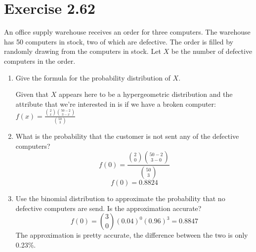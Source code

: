 \documentclass{article}
\begin{document}
\section*{Exercise 2.62}
An office supply warehouse receives an order for three computers. The warehouse has 50 computers in stock, two of which are defective. The order is filled by randomly drawing from the computers in stock. Let $X$ be the number of defective computers in the order.
\begin{enumerate}[\quad(a)]
	\item Give the formula for the probability distribution of $X$.
	\begin{center}
		Given that $X$ appears here to be a hypergeometric distribution and the attribute that we're interested in is if we have a broken computer:\\
		$ f(x) = \frac{\binom{2}{x} \binom{50-2}{3-x}}{\binom{50}{3}} $
	\end{center}
	\item What is the probability that the customer is not sent any of the defective computers?
		\[ f(0) = \frac{\binom{2}{0} \binom{50-2}{3-0}}{\binom{50}{3}} \]
		\[ f(0) = 0.8824 \]
	\item Use the binomial distribution to approximate the probability that no defective computers are send. Is the approximation accurate?
		\[ f(0) = \binom{3}{0}(0.04)^0(0.96)^{3} = 0.8847 \]
		The approximation is pretty accurate, the difference between the two is only 0.23\%.
\end{enumerate}
\end{document}
